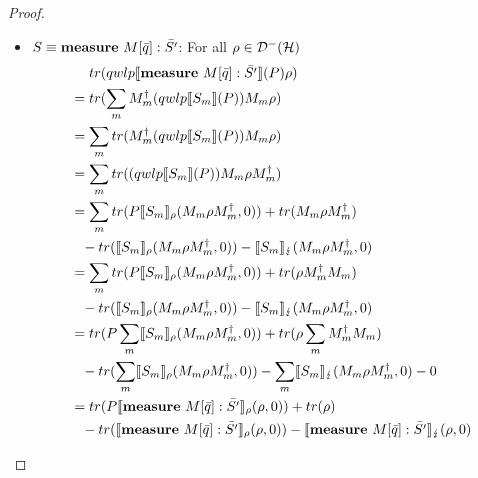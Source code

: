 \documentclass[a4paper,UKenglish,cleveref, autoref, thm-restate]{lipics-v2021}
\begin{document}
\begin{proof}
\begin{itemize}
        \item $S\equiv \mathbf{measure } \text{ }M[\Bar{q}]:\Bar{S'} $:
        For all $\rho \in \mathcal{D}^- (\mathcal{H})$
        \begin{align*}
            &\phantom{=.} tr(qwlp\llbracket \mathbf{measure } \text{ }M[\Bar{q}]:\Bar{S'} \rrbracket (P)\rho) \\
            &= tr(\sum_m M_m^\dagger (qwlp\llbracket S_m \rrbracket (P)) M_m \rho) \\
            &= \sum_m tr(M_m^\dagger (qwlp\llbracket S_m \rrbracket (P)) M_m \rho) \\
            &= \sum_m tr((qwlp\llbracket S_m \rrbracket (P)) M_m \rho M_m^\dagger) \\
            &= \sum_m tr(P \llbracket S_m \rrbracket_{\rho}(M_m \rho M_m^\dagger,0)) + tr(M_m \rho M_m^\dagger)\\
            &\phantom{=}-tr(\llbracket S_m \rrbracket_{\rho}(M_m \rho M_m^\dagger,0))- \llbracket S_m \rrbracket_{\lightning}(M_m \rho M_m^\dagger,0) \\
            &= \sum_m tr(P \llbracket S_m \rrbracket_{\rho}(M_m \rho M_m^\dagger,0)) + tr(\rho M_m^\dagger M_m )\\
            &\phantom{=}-tr(\llbracket S_m \rrbracket_{\rho}(M_m \rho M_m^\dagger,0))- \llbracket S_m \rrbracket_{\lightning}(M_m \rho M_m^\dagger,0) \\
            &= tr(P \sum_m \llbracket S_m \rrbracket_{\rho}(M_m \rho M_m^\dagger,0)) + tr(\rho \sum_m M_m^\dagger M_m )\\
            & \phantom{=}- tr(\sum_m \llbracket S_m \rrbracket_{\rho}(M_m \rho M_m^\dagger,0))- \sum_m \llbracket S_m \rrbracket_{\lightning}(M_m \rho M_m^\dagger,0) - 0\\
            &= tr(P \llbracket \mathbf{measure } \text{ }M[\Bar{q}]:\Bar{S'} \rrbracket_{\rho}(\rho,0)) + tr(\rho)\\
            &\phantom{=}-tr(\llbracket \mathbf{measure } \text{ }M[\Bar{q}]:\Bar{S'} \rrbracket_{\rho}(\rho,0))- \llbracket \mathbf{measure } \text{ }M[\Bar{q}]:\Bar{S'} \rrbracket_{\lightning}(\rho,0)
        \end{align*}


\end{itemize}
\end{proof}
\end{document}
